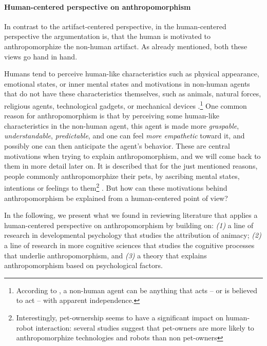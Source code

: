 \documentclass{frontiersSCNS} %
\begin{document}

\paragraph{Human-centered perspective on anthropomorphism\\}

In contrast to the artifact-centered perspective, in the human-centered perspective the argumentation is, that the human is motivated to anthropomorphize the non-human artifact. As already mentioned, both these views go hand in hand.

Humans tend to perceive human-like characteristics such as physical appearance, emotional states, or inner mental states and motivations in non-human agents that do not have these characteristics themselves, such as animals, natural forces, religious agents, technological gadgets, or mechanical devices \citep{epley_when_2008}.\footnote{According to \cite{epley_when_2008}, a non-human agent can be anything that acts -- or is believed to act -- with apparent independence.} 
One common reason for anthropomorphism is that by perceiving some human-like characteristics in the non-human agent, this agent is made more \emph{graspable}, \emph{understandable}, \emph{predictable}, and one can feel \emph{more empathetic} toward it, and possibly one can then anticipate the agent's behavior. These are central motivations when trying to explain anthropomorphism, and we will come back to them in more detail later on. 
It is described that for the just mentioned reasons, people commonly anthropomorphize their pets, by ascribing mental states, intentions or feelings to them\footnote{Interestingly, pet-ownership seems to have a significant impact on human-robot interaction: several studies suggest that pet-owners are more likely to anthropomorphize technologies and robots than non pet-owners} \cite{eddy_attribution_1993}. But how can these motivations behind anthropomorphism be explained from a human-centered point of view?

In the following, we present what we found in reviewing literature that applies a human-centered perspective on anthropomorphism by building on:
\textit{(1)} a line of research in developmental psychology that studies the attribution of animacy;
\textit{(2)} a line of research in more cognitive sciences that studies the cognitive processes that underlie anthropomorphism, and
\textit{(3)} a theory that explains anthropomorphism based on psychological factors. 
\end{document}
